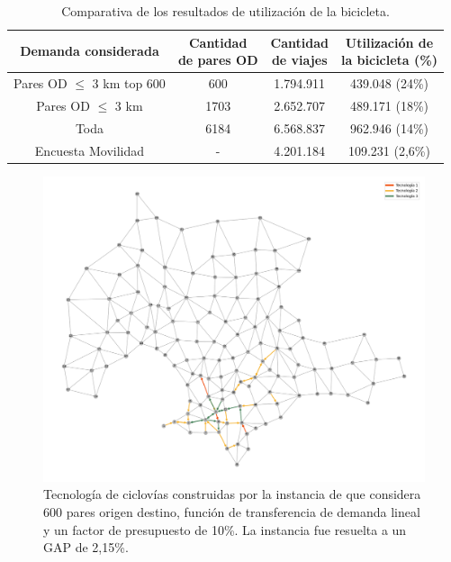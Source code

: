 \begin{table}[h!]
  \centering
  \begin{tabular}{cccc}
    \toprule
      Demanda considerada & \shortstack{Cantidad \\ de pares OD} & \shortstack{Cantidad \\ de viajes} & \shortstack{Utilización de \\ la bicicleta} (\%) \\
    \midrule
      Pares OD $\leq$ 3 km top 600 & 600   & 1.794.911 & 439.048 (24\%)  \\
      Pares OD $\leq$ 3 km         & 1703  & 2.652.707 & 489.171 (18\%)  \\
      Toda                         & 6184  & 6.568.837 & 962.946 (14\%)  \\
    \midrule
      Encuesta Movilidad           & -     & 4.201.184 & 109.231 (2,6\%) \\
    \bottomrule
  \end{tabular}
  \caption{Comparativa de los resultados de utilización de la bicicleta.}
  \label{table:montevideobikeusageresults}
\end{table}

\begin{figure}[h!]
  \centering
  \includegraphics[width=12cm]{../resources/montevideo_d3000.0_linear_0.1_budget_factor_infras.png}
    \caption{Tecnología de ciclovías construidas por la instancia de que considera 600 pares origen destino, función de transferencia de demanda lineal y un factor de presupuesto de 10\%. La instancia fue resuelta a un GAP de 2,15\%.}
  \label{fig:montevideolowbudgetinstance}
\end{figure}

